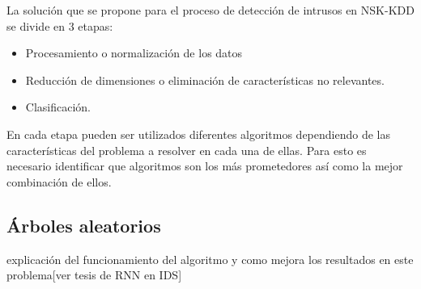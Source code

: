 La solución que se propone para el proceso de detección de intrusos en NSK-KDD se divide en 3 etapas:

\begin{itemize}
    \item Procesamiento o normalización de los datos
    \item Reducción de dimensiones o eliminación de características no relevantes.
    \item Clasificación.
\end{itemize}

En cada etapa pueden ser utilizados diferentes algoritmos dependiendo de las características del problema a resolver en cada una de ellas. Para esto es necesario identificar que algoritmos son los más prometedores así como la mejor combinación de ellos.

\subsection{Árboles aleatorios}
explicación del funcionamiento del algoritmo y como mejora los resultados en este problema[ver tesis de RNN en IDS]
